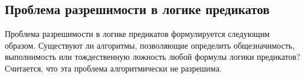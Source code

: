 \documentclass[a5paper, 11pt]{extarticle}
\theoremstyle{definition}
\theoremstyle{definition}
\theoremstyle{definition}
\numberwithin{figure}{section}
\numberwithin{table}{section}
\begin{document}
\subsection{Проблема разрешимости в логике предикатов}

Проблема разрешимости в логике предикатов формулируется следующим образом. Существуют ли алгоритмы, позволяющие определить общезначимость, выполнимость или тождественную ложность любой формулы логики предикатов? Считается, что эта проблема алгоритмически не разрешима.
\end{document}
